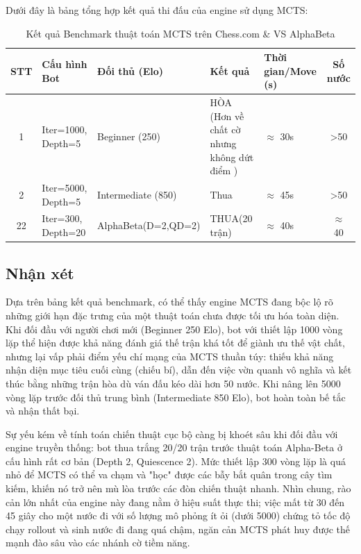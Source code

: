 Dưới đây là bảng tổng hợp kết quả thi đấu của engine sử dụng MCTS:

\begin{table}[H]
\centering
\caption{Kết quả Benchmark thuật toán  MCTS trên Chess.com \& VS AlphaBeta}
\label{tab:mcts_benchmark}
\begin{tabularx}{\textwidth}{|c|l|l|X|X|c|}
\hline
\textbf{STT} & \textbf{Cấu hình Bot} & \centering \textbf{Đối thủ (Elo)} & \textbf{Kết quả} & \textbf{Thời gian/Move (s)} & \textbf{Số nước} \\ \hline
1  & Iter=1000, Depth=5 & Beginner (250)  & HÒA (Hơn về chất cờ nhưng không dứt điểm ) & $\approx$ 30s & >50 \\ \hline
2  & Iter=5000, Depth=5 & Intermediate (850)  &  Thua &  $\approx$ 45s & >50 \\ \hline
22 & Iter=300, Depth=20 & AlphaBeta(D=2,QD=2) & THUA(20 trận) & $\approx$ 40s & $\approx$ 40 \\ \hline
\end{tabularx}
\end{table}

\subsection{Nhận xét}
Dựa trên bảng kết quả benchmark, có thể thấy engine MCTS đang bộc lộ rõ những giới hạn đặc trưng của một thuật toán chưa được tối ưu hóa toàn diện. Khi đối đầu với người chơi mới (Beginner 250 Elo), bot với thiết lập 1000 vòng lặp thể hiện được khả năng đánh giá thế trận khá tốt để giành ưu thế vật chất, nhưng lại vấp phải điểm yếu chí mạng của MCTS thuần túy: thiếu khả năng nhận diện mục tiêu cuối cùng (chiếu bí), dẫn đến việc vờn quanh vô nghĩa và kết thúc bằng những trận hòa dù ván đấu kéo dài hơn 50 nước. Khi nâng lên 5000 vòng lặp trước đối thủ trung bình (Intermediate 850 Elo), bot hoàn toàn bế tắc và nhận thất bại.

Sự yếu kém về tính toán chiến thuật cục bộ càng bị khoét sâu khi đối đầu với engine truyền thống: bot thua trắng 20/20 trận trước thuật toán Alpha-Beta ở cấu hình rất cơ bản (Depth 2, Quiescence 2). Mức thiết lập 300 vòng lặp là quá nhỏ để MCTS có thể va chạm và "học" được các bẫy bắt quân trong cây tìm kiếm, khiến nó trở nên mù lòa trước các đòn chiến thuật nhanh. Nhìn chung, rào cản lớn nhất của engine này đang nằm ở hiệu suất thực thi; việc mất từ 30 đến 45 giây cho một nước đi với số lượng mô phỏng ít ỏi (dưới 5000) chứng tỏ tốc độ chạy rollout và sinh nước đi đang quá chậm, ngăn cản MCTS phát huy được thế mạnh đào sâu vào các nhánh cờ tiềm năng.



